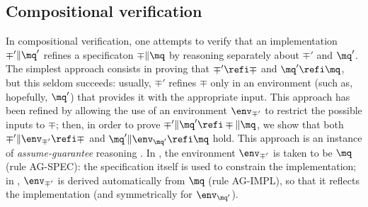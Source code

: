 \subsection{Compositional verification} 

In compositional verification, one attempts to verify that an
implementation $\mp' \| \mq'$ refines a specificaton $\mp \| \mq$ 
by reasoning separately about $\mp'$ and $\mq'$. 
The simplest approach consists in proving that $\mp' \refi \mp$ and 
$\mq' \refi \mq$, but this seldom succeeds: usually, $\mp'$ refines
$\mp$ only in an environment (such as, hopefully, $\mq'$) that
provides it with the appropriate input. 
This approach has been refined by allowing the use of an environment
$\env_{\mp'}$ to restrict the possible inputs to $\mp$; 
then, in order to prove $\mp' \| \mq' \refi \mp \| \mq$, we show 
that both $\mp' \| \env_{\mp'} \refi \mp$ and 
$\mq' \| \env_{\mq'} \refi \mq$ hold. 
This approach is an instance of {\em assume-guarantee\/} reasoning 
\cite{Stark85,AbLa95,RM96,McMillan97}.
In \cite{RM96}, the environment $\env_{\mp'}$ is taken to be
$\mq$ (rule AG-SPEC):  
the specification itself is used to constrain the implementation; 
in \cite{concur99freddy}, $\env_{\mp'}$ is derived automatically from
$\mq$ (rule AG-IMPL), so that it reflects the implementation
(and symmetrically for $\env_{\mq'}$). 

